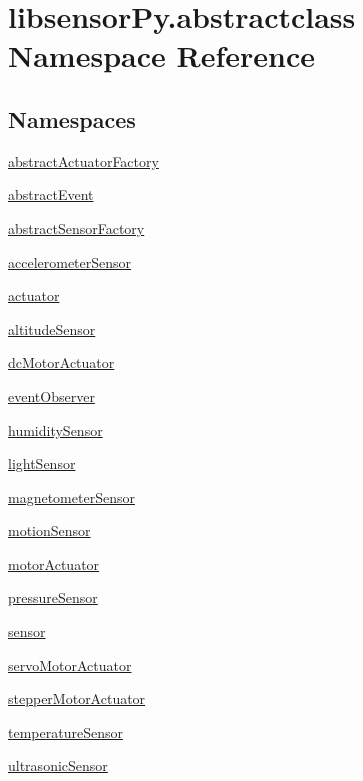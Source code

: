 \hypertarget{namespacelibsensorPy_1_1abstractclass}{}\section{libsensor\+Py.\+abstractclass Namespace Reference}
\label{namespacelibsensorPy_1_1abstractclass}
\subsection*{Namespaces}
\begin{DoxyCompactItemize}
\item 
 \hyperlink{namespacelibsensorPy_1_1abstractclass_1_1abstractActuatorFactory}{abstract\+Actuator\+Factory}
\item 
 \hyperlink{namespacelibsensorPy_1_1abstractclass_1_1abstractEvent}{abstract\+Event}
\item 
 \hyperlink{namespacelibsensorPy_1_1abstractclass_1_1abstractSensorFactory}{abstract\+Sensor\+Factory}
\item 
 \hyperlink{namespacelibsensorPy_1_1abstractclass_1_1accelerometerSensor}{accelerometer\+Sensor}
\item 
 \hyperlink{namespacelibsensorPy_1_1abstractclass_1_1actuator}{actuator}
\item 
 \hyperlink{namespacelibsensorPy_1_1abstractclass_1_1altitudeSensor}{altitude\+Sensor}
\item 
 \hyperlink{namespacelibsensorPy_1_1abstractclass_1_1dcMotorActuator}{dc\+Motor\+Actuator}
\item 
 \hyperlink{namespacelibsensorPy_1_1abstractclass_1_1eventObserver}{event\+Observer}
\item 
 \hyperlink{namespacelibsensorPy_1_1abstractclass_1_1humiditySensor}{humidity\+Sensor}
\item 
 \hyperlink{namespacelibsensorPy_1_1abstractclass_1_1lightSensor}{light\+Sensor}
\item 
 \hyperlink{namespacelibsensorPy_1_1abstractclass_1_1magnetometerSensor}{magnetometer\+Sensor}
\item 
 \hyperlink{namespacelibsensorPy_1_1abstractclass_1_1motionSensor}{motion\+Sensor}
\item 
 \hyperlink{namespacelibsensorPy_1_1abstractclass_1_1motorActuator}{motor\+Actuator}
\item 
 \hyperlink{namespacelibsensorPy_1_1abstractclass_1_1pressureSensor}{pressure\+Sensor}
\item 
 \hyperlink{namespacelibsensorPy_1_1abstractclass_1_1sensor}{sensor}
\item 
 \hyperlink{namespacelibsensorPy_1_1abstractclass_1_1servoMotorActuator}{servo\+Motor\+Actuator}
\item 
 \hyperlink{namespacelibsensorPy_1_1abstractclass_1_1stepperMotorActuator}{stepper\+Motor\+Actuator}
\item 
 \hyperlink{namespacelibsensorPy_1_1abstractclass_1_1temperatureSensor}{temperature\+Sensor}
\item 
 \hyperlink{namespacelibsensorPy_1_1abstractclass_1_1ultrasonicSensor}{ultrasonic\+Sensor}
\end{DoxyCompactItemize}
